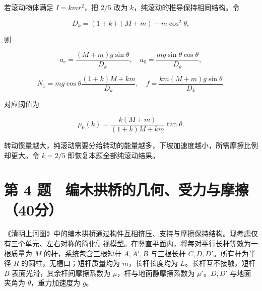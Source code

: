\documentclass[12pt,a4paper,fontset=fandol]{ctexart}
\begin{document}
若滚动物体满足 \(I=kmr^2\)，把 \(2/5\) 改为
\(k\)，纯滚动的推导保持相同结构。令

\[D_k=(1+k)(M+m)-m\cos^2\theta,\]

则

\[a_c=\frac{(M+m)g\sin\theta}{D_k},\quad
a_0=\frac{mg\sin\theta\cos\theta}{D_k},\]

\[N_1=mg\cos\theta\frac{(1+k)M+km}{D_k},\quad
f=\frac{km(M+m)g\sin\theta}{D_k}.\]

对应阈值为

\[\boxed{\mu_0(k)=\frac{k(M+m)}{(1+k)M+km}\tan\theta.}\]

转动惯量越大，纯滚动需要分给转动的能量越多，下坡加速度越小，所需摩擦比例却更大。令
\(k=2/5\) 即恢复本题全部纯滚动结果。

\clearpage

\section{第 4
题　编木拱桥的几何、受力与摩擦（40分）}\label{ux7b2c-4-ux9898-ux7f16ux6728ux62f1ux6865ux7684ux51e0ux4f55ux53d7ux529bux4e0eux6469ux64e640ux5206}

《清明上河图》中的编木拱桥通过构件互相挤压、支持与摩擦保持结构。现考虑仅有三个单元、左右对称的简化侧视模型。在竖直平面内，将每对平行长杆等效为一根质量为
\(M\) 的杆，系统包含三根短杆 \(A,A',B\) 与三根长杆
\(C,D,D'\)。所有杆为半径 \(R\) 的圆柱，无槽口；短杆质量均为
\(m\)，长杆长度均为 \(L\)。长杆互不接触，短杆 \(B\)
表面光滑，其余杆间摩擦系数为 \(\mu\)，杆与地面静摩擦系数为
\(\mu'\)。\(D,D'\) 与地面夹角为 \(\theta\)，重力加速度为 \(g\)。
\end{document}
